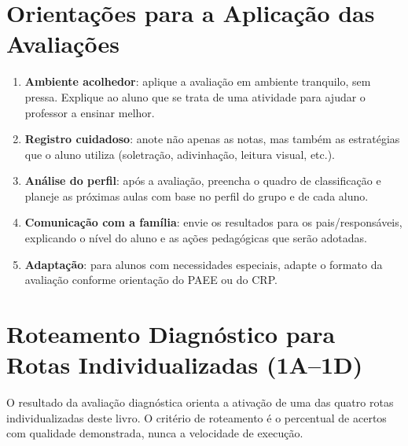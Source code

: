 
\section{Orientações para a Aplicação das Avaliações}

\begin{enumerate}[leftmargin=2cm]
  \item \textbf{Ambiente acolhedor}: aplique a avalia\c{c}\~{a}o em
  ambiente tranquilo, sem pressa. Explique ao aluno que se trata de
  uma atividade para ajudar o professor a ensinar melhor.

  \item \textbf{Registro cuidadoso}: anote n\~{a}o apenas as notas,
  mas tamb\'{e}m as estrat\'{e}gias que o aluno utiliza (soletra\c{c}\~{a}o,
  adivinha\c{c}\~{a}o, leitura visual, etc.).

  \item \textbf{Análise do perfil}: ap\'{o}s a avalia\c{c}\~{a}o, preencha
  o quadro de classifica\c{c}\~{a}o e planeje as pr\'{o}ximas aulas
  com base no perfil do grupo e de cada aluno.

  \item \textbf{Comunica\c{c}\~{a}o com a fam\'{i}lia}: envie os
  resultados para os pais/respons\'{a}veis, explicando o n\'{i}vel
  do aluno e as a\c{c}\~{o}es pedag\'{o}gicas que ser\~{a}o adotadas.

  \item \textbf{Adapta\c{c}\~{a}o}: para alunos com necessidades
  especiais, adapte o formato da avalia\c{c}\~{a}o conforme orienta\c{c}\~{a}o
  do PAEE ou do CRP.
\end{enumerate}

\section{Roteamento Diagnóstico para Rotas Individualizadas (1A--1D)}

O resultado da avaliação diagnóstica orienta a ativação de uma das quatro rotas
individualizadas deste livro. O critério de roteamento é o percentual de
acertos com qualidade demonstrada, nunca a velocidade de execução.

